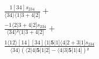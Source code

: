 \documentclass[varwidth, border=5pt]{standalone}
\begin{document}
\begin{my}
$\begin{gathered}
\scriptscriptstyle\frac{1[34]s_{234}}{⟨34⟩⟨1|3+4|2]} +\\
\scriptscriptstyle\frac{-1⟨2|3+4|2]s_{234}}{⟨34⟩²⟨1|3+4|2]} +\\
\scriptscriptstyle\frac{1⟨12⟩[14][34]⟨1|𝟓|1]⟨4|2+3|1]s_{234}}{⟨34⟩(⟨2|4|𝟓|1|2]-⟨4|3|𝟓|1|4])²} \phantom{+}
\end{gathered}$
\end{my}
\end{document}
